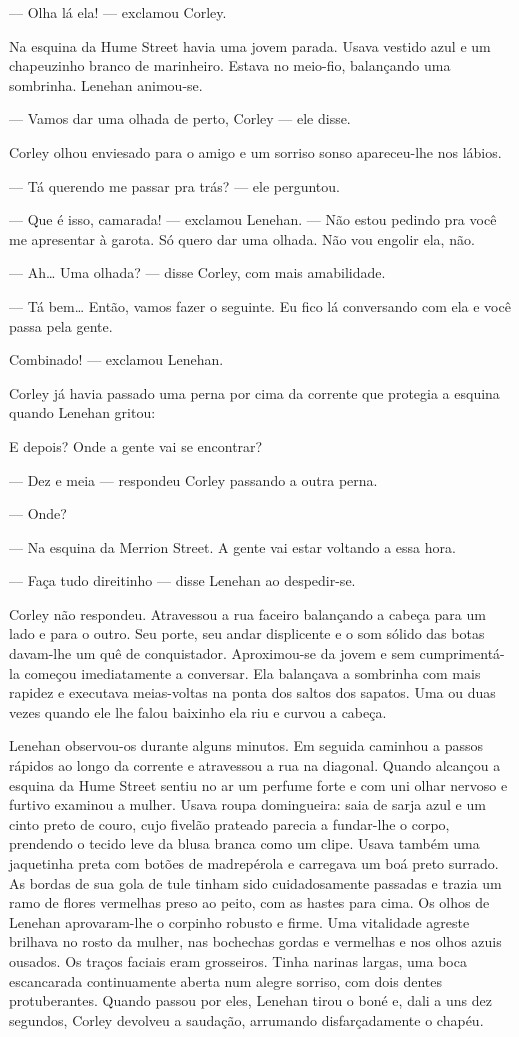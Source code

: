 --- Olha lá ela! --- exclamou Corley.

Na esquina da Hume Street havia uma jovem parada. Usava vestido azul
e um chapeuzinho branco de marinheiro. Estava no meio-fio, balançando
uma sombrinha. Lenehan animou-se.

--- Vamos dar uma olhada de perto, Corley --- ele disse.

Corley olhou enviesado para o amigo e um sorriso sonso apareceu-lhe
nos lábios.

--- Tá querendo me passar pra trás? --- ele perguntou.

--- Que é isso, camarada! --- exclamou Lenehan. --- Não estou pedindo
pra você me apresentar à garota. Só quero dar uma olhada. Não vou
engolir ela, não.

--- Ah\ldots{} Uma olhada? --- disse Corley, com mais amabilidade.

--- Tá bem\ldots{} Então, vamos fazer o seguinte. Eu fico lá conversando
com ela e você passa pela gente.

Combinado! --- exclamou Lenehan.

Corley já havia passado uma perna por cima da corrente que protegia a
esquina quando Lenehan gritou:

E depois? Onde a gente vai se encontrar?

--- Dez e meia --- respondeu Corley passando a outra perna.

--- Onde?

--- Na esquina da Merrion Street. A gente vai estar voltando a essa
hora.

--- Faça tudo direitinho --- disse Lenehan ao despedir-se.

Corley não respondeu. Atravessou a rua faceiro balançando a cabeça
para um lado e para o outro. Seu porte, seu andar displicente e o
som sólido das botas davam-lhe um quê de conquistador. Aproximou-se da
jovem e sem cumprimentá-la começou imediatamente a conversar. Ela
balançava a sombrinha com mais rapidez e executava meias-voltas na
ponta dos saltos dos sapatos. Uma ou duas vezes quando ele lhe falou
baixinho ela riu e curvou a cabeça.

Lenehan observou-os durante alguns minutos. Em seguida caminhou a
passos rápidos ao longo da corrente e atravessou a rua na diagonal.
Quando alcançou a esquina da Hume Street sentiu no ar um perfume forte
e com uni olhar nervoso e furtivo examinou a mulher. Usava roupa
domingueira: saia de sarja azul e um cinto preto de couro, cujo
fivelão prateado parecia a fundar-lhe o corpo, prendendo o tecido
leve da blusa branca como um clipe. Usava também uma jaquetinha preta
com botões de madrepérola e carregava um boá preto surrado. As
bordas de sua gola de tule tinham sido cuidadosamente passadas e
trazia um ramo de flores vermelhas preso ao peito, com as hastes para
cima. Os olhos de Lenehan aprovaram-lhe o corpinho robusto e firme.
Uma vitalidade agreste brilhava no rosto da mulher, nas bochechas
gordas e vermelhas e nos olhos azuis ousados. Os traços faciais eram
grosseiros. Tinha narinas largas, uma boca escancarada continuamente
aberta num alegre sorriso, com dois dentes protuberantes. Quando
passou por eles, Lenehan tirou o boné e, dali a uns dez segundos,
Corley devolveu a saudação, arrumando disfarçadamente o chapéu.

